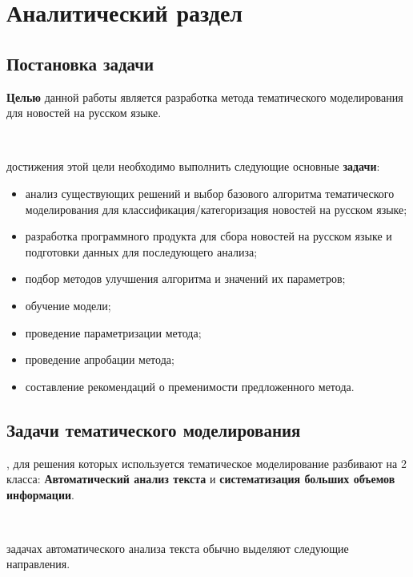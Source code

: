 \chapter{Аналитический раздел}

%
\section{Постановка задачи}

\noindent\textbf{Целью} данной работы является разработка метода тематического моделирования для новостей на русском языке.

~\

 достижения этой цели необходимо выполнить следующие основные \textbf{задачи}:

\begin{itemize}
    \item \todo{}анализ существующих решений и выбор базового алгоритма тематического моделирования для классификация/категоризация новостей на русском языке;
    \item разработка программного продукта для сбора новостей на русском языке и подготовки данных для последующего анализа;
    \item подбор методов улучшения алгоритма и значений их параметров;
    \item обучение модели;
    \item проведение параметризации метода;
    \item \todo{}проведение апробации метода;
    \item составление рекомендаций о пременимости предложенного метода.
\end{itemize}

%
\section{Задачи тематического моделирования}


, для решения которых используется тематическое моделирование разбивают на 2 класса: \textbf{Автоматический анализ текста} и \textbf{систематизация больших объемов информации}.

~\

 задачах автоматического анализа текста обычно выделяют следующие направления.

